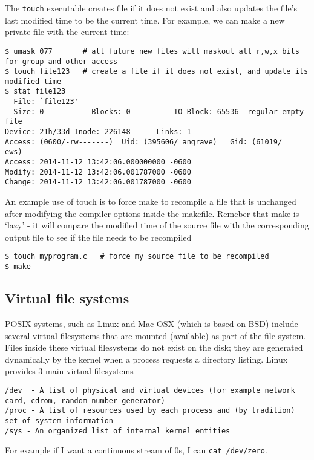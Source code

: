 The \texttt{touch} executable creates file if it does not exist and also
updates the file's last modified time to be the current time. For
example, we can make a new private file with the current time:

\begin{verbatim}
$ umask 077       # all future new files will maskout all r,w,x bits for group and other access
$ touch file123   # create a file if it does not exist, and update its modified time
$ stat file123
  File: `file123'
  Size: 0           Blocks: 0          IO Block: 65536  regular empty file
Device: 21h/33d Inode: 226148      Links: 1
Access: (0600/-rw-------)  Uid: (395606/ angrave)   Gid: (61019/     ews)
Access: 2014-11-12 13:42:06.000000000 -0600
Modify: 2014-11-12 13:42:06.001787000 -0600
Change: 2014-11-12 13:42:06.001787000 -0600
\end{verbatim}

An example use of touch is to force make to recompile a file that is
unchanged after modifying the compiler options inside the makefile.
Remeber that make is `lazy' - it will compare the modified time of the
source file with the corresponding output file to see if the file needs
to be recompiled

\begin{verbatim}
$ touch myprogram.c   # force my source file to be recompiled
$ make
\end{verbatim}

\subsection{Virtual file systems}\label{virtual-file-systems}

POSIX systems, such as Linux and Mac OSX (which is based on BSD) include
several virtual filesystems that are mounted (available) as part of the
file-system. Files inside these virtual filesystems do not exist on the
disk; they are generated dynamically by the kernel when a process
requests a directory listing. Linux provides 3 main virtual filesystems

\begin{verbatim}
/dev  - A list of physical and virtual devices (for example network card, cdrom, random number generator)
/proc - A list of resources used by each process and (by tradition) set of system information
/sys - An organized list of internal kernel entities
\end{verbatim}

For example if I want a continuous stream of 0s, I can
\texttt{cat\ /dev/zero}.

